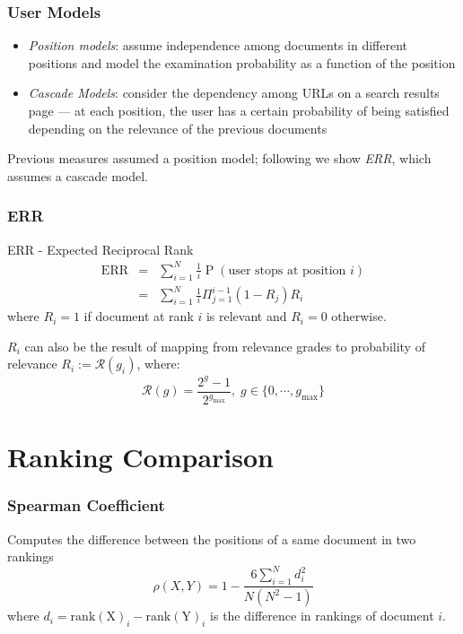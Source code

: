 \documentclass[svgnames]{beamer}
\begin{document}
\begin{frame}
    \frametitle{User Models}
    \begin{itemize}
    \item \emph{Position models}: assume independence among documents in
        different positions and model the examination probability as a function
        of the position
    \item \emph{Cascade Models}: consider the dependency among URLs on a search
        results page --- at each position, the user has a certain probability
        of being satisfied depending on the relevance of the previous documents
    \end{itemize}
    Previous measures assumed a position model; following we show \textit{ERR}, which
    assumes a cascade model.
\end{frame}

\begin{frame} \frametitle{ERR}
\begin{block}{ERR - Expected Reciprocal Rank}
        \begin{eqnarray*}
            \operatorname{ERR} & = & \sum_{i=1}^N \frac{1}{i} {\operatorname{P}}(\text{user stops at position~} i) \\
                               & = & \sum_{i=1}^N \frac{1}{i} \Pi_{j=1}^{i-1}(1 - R_j) R_i
        \end{eqnarray*}
        where $R_i = 1$ if document at rank $i$ is relevant and $R_i = 0$
        otherwise.

        $R_i$ can also be the result of mapping from relevance grades to
        probability of relevance $R_i := \mathcal{R}(g_i)$, where:
        \begin{displaymath}
        \mathcal{R}(g) = \frac{2^g - 1}{2^{g_{\max}}}, \; g \in \{0, \cdots, g_{\max}\}
        \end{displaymath}
  \end{block}
\end{frame}


\section{Ranking Comparison}

\begin{frame}
    \frametitle{Spearman Coefficient}

    \begin{block}{}
        Computes the difference between the positions of a same document in two
        rankings
        \begin{displaymath}
            \rho(X,Y) = 1 - \frac{6\sum_{i=1}^N d_i^2}{N(N^2-1)}
        \end{displaymath}
        where $d_i = \operatorname{rank(X)}_i - \operatorname{rank(Y)}_i$ is
        the difference in rankings of document $i$.
    \end{block}

\end{frame}
\end{document}
